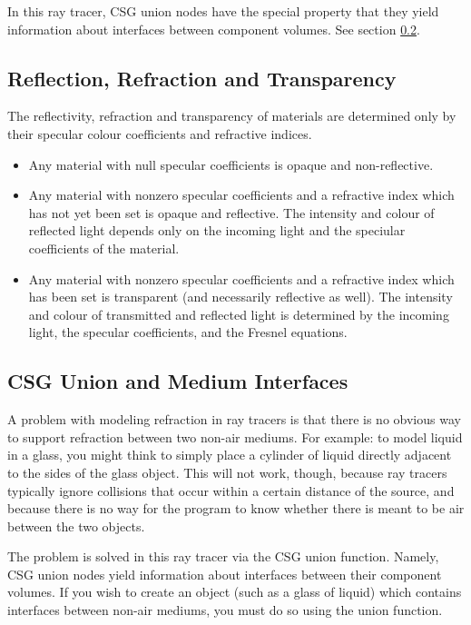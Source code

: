 \documentclass{article}
\begin{document}
In this ray tracer, CSG union nodes have the special property that they yield
information about interfaces between component volumes. See section
\ref{csg_union}.

\subsection{Reflection, Refraction and Transparency}
\label{rrt}

The reflectivity, refraction and transparency of materials are determined only by
their specular colour coefficients and refractive indices.

\begin{itemize}
  \item Any material with null specular coefficients is opaque and non-reflective.
  \item Any material with nonzero specular coefficients and a refractive index
    which has not yet been set is opaque and reflective. The intensity and
    colour of reflected light depends only on the incoming light and the
    speciular coefficients of the material.
  \item Any material with nonzero specular coefficients and a refractive index
    which has been set is transparent (and necessarily reflective as well). The
    intensity and colour of transmitted and reflected light is determined by the
    incoming light, the specular coefficients, and the Fresnel equations.
\end{itemize}

\subsection{CSG Union and Medium Interfaces}
\label{csg_union}

A problem with modeling refraction in ray tracers is that there is no obvious
way to support refraction between two non-air mediums. For example: to model
liquid in a glass, you might think to simply place a cylinder of liquid directly
adjacent to the sides of the glass object. This will not work, though, because
ray tracers typically ignore collisions that occur within a certain distance of
the source, and because there is no way for the program to know whether there is
meant to be air between the two objects.

The problem is solved in this ray tracer via the CSG union function. Namely, CSG
union nodes yield information about interfaces between their component volumes.
If you wish to create an object (such as a glass of liquid) which contains
interfaces between non-air mediums, you must do so using the union function.
\end{document}
